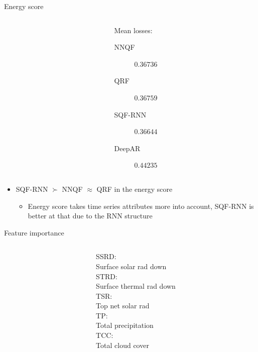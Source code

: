 \documentclass[10pt,aspectratio=169]{beamer}
\begin{document}
\begin{frame}[fragile]{Energy score}
    \begin{columns}
    \begin{column}{0.5\textwidth}
    \begin{flushright}
        
    \end{flushright}
    \end{column}
    \begin{column}{0.5\textwidth}
    Mean losses:
    \begin{description}
        \item[NNQF] \(0.36736\)
        \item[QRF] \(0.36759\)
        \item[SQF-RNN] \(0.36644\)
        \item[DeepAR] \(0.44235\)
    \end{description}
    \end{column}
    \end{columns}
    
    \begin{itemize}
        \item SQF-RNN \(\succ\) NNQF \(\approx\) QRF in the energy score
        \begin{itemize}
            \item Energy score takes time series attributes more into account, SQF-RNN is better at that due to the RNN structure
        \end{itemize}
    \end{itemize}
\end{frame}

\begin{frame}{Feature importance}
    \begin{columns}
    \begin{column}{0.8\textwidth}
        
    \end{column}
    \begin{column}{0.3\textwidth}
        SSRD: \\Surface solar rad down\\
        STRD: \\Surface thermal rad down\\
        TSR: \\Top net solar rad\\
        TP: \\Total precipitation\\
        TCC: \\Total cloud cover
    \end{column}
    \end{columns}
\end{frame}
\end{document}
